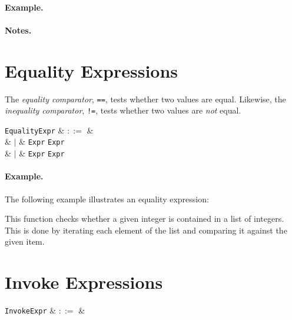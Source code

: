\paragraph{Example.}

\paragraph{Notes.}


\section{Equality Expressions}
\label{c_expr_equality}
The {\em equality comparator}, \lstinline{==}, tests whether two values are equal.  Likewise, the {\em inequality comparator}, \lstinline{!=}, tests whether two values are {\em not} equal.

\begin{syntax}
  \verb+EqualityExpr+ & $::=$ &\\
  & $|$ & \verb+Expr+ \token{==} \verb+Expr+\\
  & $|$ & \verb+Expr+ \token{!=} \verb+Expr+\\
\end{syntax}

\paragraph{Example.}

The following example illustrates an equality expression:



This function checks whether a given integer is contained in a list of integers.  This is done by iterating each element of the list and comparing it against the given item.


\section{Invoke Expressions}
\label{c_expr_invoke}

\begin{syntax}
  \verb+InvokeExpr+ & $::=$ &\\
\end{syntax}

